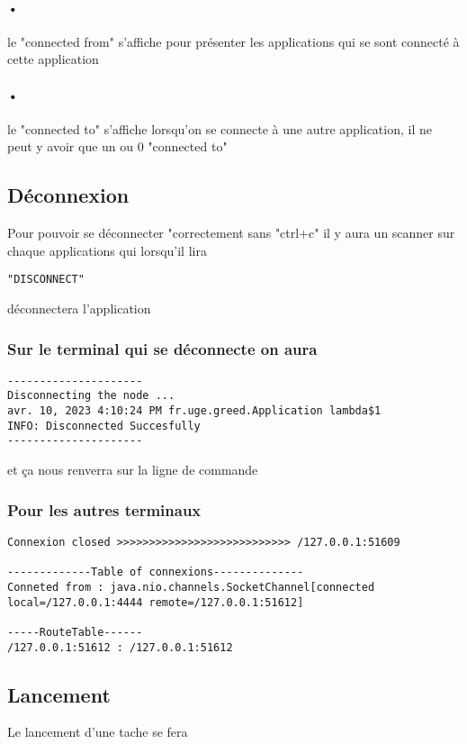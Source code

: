 \documentclass[a4paper,titlepage]{report}
\begin{document}
\paragraph{•}
le "connected from" s'affiche pour présenter les applications qui se sont connecté à cette application
\paragraph{•}
le "connected to" s'affiche lorsqu'on se connecte à une autre application, il ne peut y avoir que un ou 0 "connected to"
\subsection{Déconnexion}
Pour pouvoir se déconnecter "correctement sans "ctrl+c" il y aura un scanner sur chaque applications qui lorsqu'il lira 
\begin{lstlisting}
"DISCONNECT" 
\end{lstlisting}
déconnectera l'application 
\subsubsection{Sur le terminal qui se déconnecte on aura}
\begin{lstlisting}
---------------------
Disconnecting the node ...
avr. 10, 2023 4:10:24 PM fr.uge.greed.Application lambda$1
INFO: Disconnected Succesfully
---------------------
\end{lstlisting}
et ça nous renverra sur la ligne de commande
\subsubsection{Pour les autres terminaux}
\begin{lstlisting}
Connexion closed >>>>>>>>>>>>>>>>>>>>>>>>>>> /127.0.0.1:51609

-------------Table of connexions--------------
Conneted from : java.nio.channels.SocketChannel[connected local=/127.0.0.1:4444 remote=/127.0.0.1:51612]

-----RouteTable------
/127.0.0.1:51612 : /127.0.0.1:51612
\end{lstlisting}
\subsection{Lancement}
Le lancement d'une tache se fera 
\end{document}
